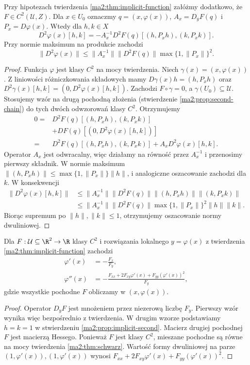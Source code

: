 \begin{stwierdzenie}
\label{ma2:prop:implicit-second}
Przy hipotezach twierdzenia \ref{ma2:thm:implicit-function}
załóżmy dodatkowo, że $F\in C^2(\mathcal U,Z)$.
Dla $x\in U_0$ oznaczmy $q=(x,\varphi(x))$,
$A_x=D_yF(q)$ i $P_x=D\varphi(x)$.
Wtedy dla $h,k\in X$
\[
 D^2\varphi(x)[h,k]
 =-A_x^{-1}D^2F(q)[(h,P_xh),(k,P_xk)].
\]
Przy normie maksimum na produkcie zachodzi
\[
 \|D^2\varphi(x)\|
 \le\|A_x^{-1}\|\|D^2F(q)\|
                  \max\{1,\|P_x\|\}^2.
\]
\end{stwierdzenie}
\begin{proof}
Funkcja $\varphi$ jest klasy $C^2$ na mocy twierdzenia.
Niech $\gamma(x)=(x,\varphi(x))$. Z liniowości
różniczkowania składowych mamy
$D\gamma(x)h=(h,P_xh)$ oraz
$D^2\gamma(x)[h,k]=(0,D^2\varphi(x)[h,k])$.
Zachodzi $F\circ\gamma=0$, a $\gamma(U_0)\subseteq\mathcal U$.
Stosujemy wzór na drugą pochodną złożenia
(stwierdzenie \ref{ma2:prop:second-chain}) do tych
dwóch odwzorowań klasy $C^2$. Otrzymujemy
\[
 \begin{aligned}
 0={}&D^2F(q)[(h,P_xh),(k,P_xk)]\\
     &+DF(q)[(0,D^2\varphi(x)[h,k])]\\
   ={}&D^2F(q)[(h,P_xh),(k,P_xk)]
      +A_xD^2\varphi(x)[h,k].
 \end{aligned}
\]
Operator $A_x$ jest odwracalny, więc działamy na
równość przez $A_x^{-1}$ i przenosimy pierwszy składnik.
W normie maksimum
$\|(h,P_xh)\|\le\max\{1,\|P_x\|\}\|h\|$,
i analogiczne oszacowanie zachodzi dla $k$.
W konsekwencji
\[
 \begin{aligned}
 \|D^2\varphi(x)[h,k]\|
 &\le\|A_x^{-1}\|\|D^2F(q)\|
       \|(h,P_xh)\|\|(k,P_xk)\|\\
 &\le\|A_x^{-1}\|\|D^2F(q)\|
       \max\{1,\|P_x\|\}^2\|h\|\|k\|.
 \end{aligned}
\]
Biorąc supremum po $\|h\|,\|k\|\le1$, otrzymujemy
oszacowanie normy dwuliniowej.
\end{proof}

\begin{wniosek}
\label{ma2:cor:implicit-scalar}
Dla $F:\mathcal U\subseteq\R^2\to\R$ klasy $C^2$
i rozwiązania lokalnego $y=\varphi(x)$ z twierdzenia
\ref{ma2:thm:implicit-function} zachodzi
\[
 \begin{aligned}
 \varphi'(x)&=-\frac{F_x}{F_y},\\
 \varphi''(x)&=-\frac{F_{xx}+2F_{xy}\varphi'(x)
                          +F_{yy}(\varphi'(x))^2}{F_y},
 \end{aligned}
\]
gdzie wszystkie pochodne $F$ obliczamy w $(x,\varphi(x))$.
\end{wniosek}
\begin{proof}
Operator $D_yF$ jest mnożeniem przez niezerową liczbę
$F_y$. Pierwszy wzór wynika więc bezpośrednio z twierdzenia.
W drugim wzorze podstawiamy $h=k=1$ w stwierdzeniu
\ref{ma2:prop:implicit-second}. Macierz drugiej
pochodnej $F$ jest macierzą Hessego.
Ponieważ $F$ jest klasy $C^2$, mieszane pochodne
są równe na mocy twierdzenia \ref{ma2:thm:schwarz}.
Wartość formy dwuliniowej na parze
$(1,\varphi'(x)),(1,\varphi'(x))$ wynosi
$F_{xx}+2F_{xy}\varphi'(x)+F_{yy}(\varphi'(x))^2$.
\end{proof}


